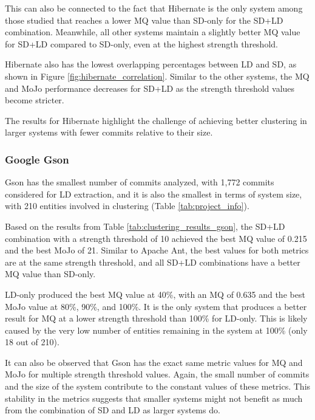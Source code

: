 \documentclass{ieeeaccess}
\begin{document}
This can also be connected to the fact that Hibernate is the only system among those studied that reaches a lower MQ value than SD-only for the SD+LD combination. Meanwhile, all other systems maintain a slightly better MQ value for SD+LD compared to SD-only, even at the highest strength threshold.


Hibernate also has the lowest overlapping percentages between LD and SD, as shown in Figure \ref{fig:hibernate_correlation}. Similar to the other systems, the MQ and MoJo performance decreases for SD+LD as the strength threshold values become stricter.

The results for Hibernate highlight the challenge of achieving better clustering in larger systems with fewer commits relative to their size.



\subsubsection{Google Gson}

Gson has the smallest number of commits analyzed, with 1,772 commits considered for LD extraction, and it is also the smallest in terms of system size, with 210 entities involved in clustering (Table \ref{tab:project_info}).

Based on the results from Table \ref{tab:clustering_results_gson}, the SD+LD combination with a strength threshold of 10 achieved the best MQ value of 0.215 and the best MoJo of 21. Similar to Apache Ant, the best values for both metrics are at the same strength threshold, and all SD+LD combinations have a better MQ value than SD-only.

LD-only produced the best MQ value at 40\%, with an MQ of 0.635 and the best MoJo value at 80\%, 90\%, and 100\%. It is the only system that produces a better result for MQ at a lower strength threshold than 100\% for LD-only. This is likely caused by the very low number of entities remaining in the system at 100\% (only 18 out of 210).

It can also be observed that Gson has the exact same metric values for MQ and MoJo for multiple strength threshold values. Again, the small number of commits and the size of the system contribute to the constant values of these metrics. This stability in the metrics suggests that smaller systems might not benefit as much from the combination of SD and LD as larger systems do.
\end{document}

